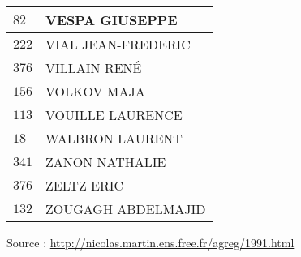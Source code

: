 \begin{xltabular}{\linewidth}{|l|X|}
    \hline
    $82$ & VESPA GIUSEPPE \\
    \hline
    $222$ & VIAL JEAN-FREDERIC \\
    \hline
    $376$ & VILLAIN RENÉ \\
    \hline
    $156$ & VOLKOV MAJA \\
    \hline
    $113$ & VOUILLE LAURENCE \\
    \hline
    $18$ & WALBRON LAURENT \\
    \hline
    $341$ & ZANON NATHALIE \\
    \hline
    $376$ & ZELTZ ERIC \\
    \hline
    $132$ & ZOUGAGH ABDELMAJID \\
    \hline
  \end{xltabular}

  \begin{flushright}
    {\tiny Source : \url{http://nicolas.martin.ens.free.fr/agreg/1991.html}}
  \end{flushright}

